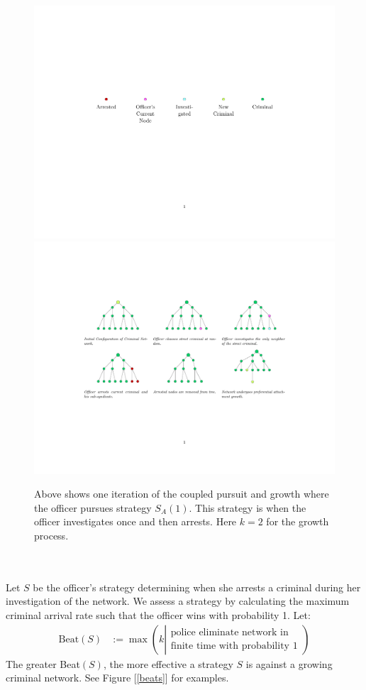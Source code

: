 \documentclass[11pt]{article}
\theoremstyle{plain}
\theoremstyle{definition}
\begin{document}
\begin{figure}\centering
\includegraphics[width = .7\textwidth]{Key.pdf}
\includegraphics[width = \textwidth]{PursuitEvolution.pdf}
\caption{Above shows one iteration of the coupled pursuit and growth where the officer pursues strategy $S_A(1)$.  This strategy is when the officer investigates once and then arrests.  Here $k = 2$ for the growth process. }
\label{pe}
\end{figure}\\
\\
Let $S$ be the officer's strategy determining when she arrests a criminal during her investigation of the network.  We assess a strategy by calculating the maximum criminal arrival rate such that the officer wins with probability 1.  Let:
\begin{align*}
\textrm{Beat}(S) &:=\max\left(k \left| \substack{\textrm{police eliminate network in}\\ \textrm{finite time with probability 1}}\right.\right)
\end{align*}
The greater Beat$(S)$, the more effective a strategy $S$ is against a growing criminal network.  See Figure [\ref{beats}] for examples.
\end{document}
